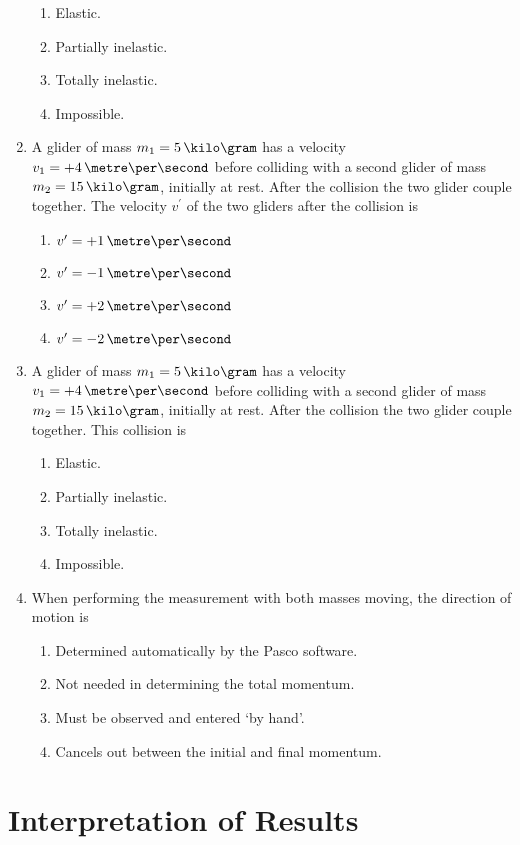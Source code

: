 \begin{enumerate}
  \begin{enumerate}
  \item Elastic.
  \item Partially inelastic.
  \item Totally inelastic.
  \item Impossible.
  \end{enumerate}
\item  A glider of mass $m_1 = 5\,\kilo\gram$ has a velocity $v_1 = +4\,\metre\per\second$ before colliding with a second glider of mass $m_2 = 15\,\kilo\gram$, initially at rest.  After the collision the two glider couple together. The velocity $v^\prime$ of the two gliders after the collision is
  \begin{enumerate}
  \item $v^\prime = +1\,\metre\per\second$
  \item $v^\prime = -1\,\metre\per\second$
  \item $v^\prime = +2\,\metre\per\second$
  \item $v^\prime = -2\,\metre\per\second$
  \end{enumerate}
\item  A glider of mass $m_1 = 5\,\kilo\gram$ has a velocity $v_1 = +4\,\metre\per\second$ before colliding with a second glider of mass $m_2 = 15\,\kilo\gram$, initially at rest.  After the collision the two glider couple together.  This collision is
  \begin{enumerate}
  \item Elastic.
  \item Partially inelastic.
  \item Totally inelastic.
  \item Impossible.
  \end{enumerate}
\item  When performing the measurement with both masses moving, the direction of motion is
  \begin{enumerate}
  \item Determined automatically by the Pasco software.
  \item Not needed in determining the total momentum.
  \item Must be observed and entered `by hand'.
  \item Cancels out between the initial and final momentum.
  \end{enumerate}
\end{enumerate}

\section{Interpretation of Results}

